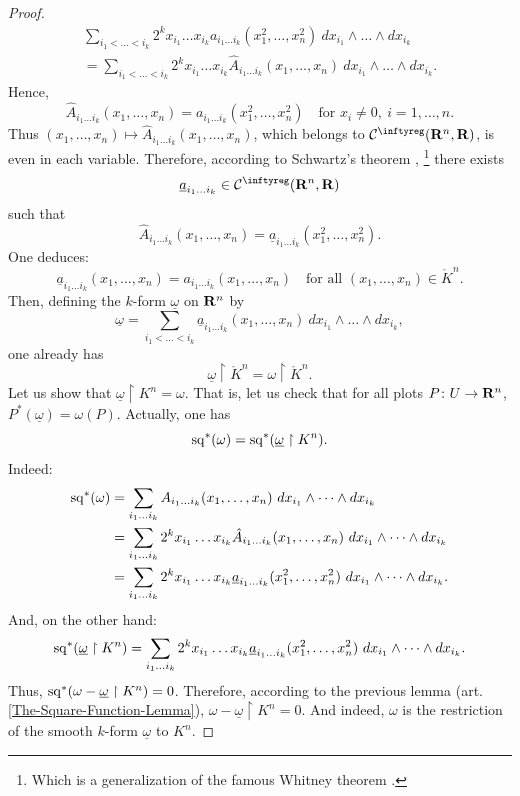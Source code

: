 \begin{proof}
\begin{align*}
     \sum_{i_1<\dots<i_k} 2^k x_{i_1}\dots x_{i_k} a_{i_1 \dots i_k}(x_1^2,\dots, x_n^2)\ dx_{i_1} \wedge \dots \wedge dx_{i_k} \\
     = \sum_{i_1<\dots<i_k} 2^k x_{i_1}\dots x_{i_k} \hat A_{i_1 \dots i_k}(x_1,\dots, x_n) \ dx_{i_1} \wedge \dots \wedge dx_{i_k}.
  \end{align*}
  Hence,
  $$%
    \hat A_{i_1 \dots i_k}(x_1,\dots, x_n) = a_{i_1 \dots i_k}(x_1^2,\dots, x_n^2) \quad \text{for } x_i \neq 0,\ i = 1,\dots,n.
  $$%
  Thus $(x_1,\dots, x_n) \mapsto \hat A_{i_1 \dots i_k}(x_1,\dots, x_n)$,
  which belongs to $\Cinfty(\RR^n,\RR)$,
  is even in each variable.
  Therefore,
  according to Schwartz's theorem \cite{Sch75},%
  \footnote{Which is a generalization of the famous Whitney theorem \cite{Whi43}.}
  there exists
  $$%
    \underline{a}_{i_1 \dots i_k} \in \Cinfty(\RR^n,\RR)
  $$%
  such that
  $$%
    \hat A_{i_1 \dots i_k}(x_1,\dots, x_n) = \underline{a}_{i_1 \dots i_k}(x_1^2,\dots, x_n^2).
  $$%
  One deduces:
  $$%
    \underline{a}_{i_1 \dots i_k}(x_1,\dots, x_n) = a_{i_1 \dots i_k}(x_1,\dots, x_n) \quad \text{for all } (x_1,\dots, x_n) \in \mathring{K}^n.
  $$%
  Then,
  defining the $k$-form $\underline\omega$ on $\mathbf{R}^n$ by
  $$%
    \underline\omega = \sum_{i_1<\dots<i_k} \underline{a}_{i_1 \dots i_k}(x_1, \dots, x_n)\ dx_{i_1} \wedge \dots \wedge dx_{i_k},
  $$%
  one already has
  $$%
    \underline\omega \restriction \mathring K^n = \omega \restriction \mathring K^n.
  $$%
  Let us show that $\underline\omega \restriction K^n = \omega$.
  That is,
  let us check that for all plots $P \colon U \to \mathbf{R}^n$,
  $P^*(\underline\omega) = \omega(P)$.
  Actually,
  one has
  $$%
    \Sq^*(\omega) = \Sq^*(\underline\omega \restriction K^n).
  $$%
  Indeed:
  \begin{align*}
    {\operatorname{sq}}^*(\omega) & = \sum_{i_1\dots i_k} A_{i_1\dots i_k}(x_1,\dots,x_n)\ dx_{i_1}\wedge\dots\wedge dx_{i_k} \\
    & = \sum_{i_1\dots i_k} 2^k x_{i_1} \dots x_{i_k} \hat A_{i_1\dots i_k}(x_1,\dots,x_n)\ dx_{i_1}\wedge\dots\wedge dx_{i_k} \\
    & =  \sum_{i_1\dots i_k} 2^k x_{i_1} \dots x_{i_k} \underline{a}_{i_1\dots i_k}(x_1^2,\dots,x_n^2)\ dx_{i_1}\wedge\dots\wedge dx_{i_k}.
  \end{align*}
  And,
  on the other hand:
  \begin{eqnarray*}
    {\operatorname{sq}}^*(\underline\omega\restriction K^n) = \sum_{i_1\dots i_k} 2^k x_{i_1} \dots x_{i_k} \underline{a}_{i_1\dots i_k}(x_1^2,\dots,x_n^2)\ dx_{i_1}\wedge\dots\wedge dx_{i_k}.
  \end{eqnarray*}
  Thus,
  ${\operatorname{sq}}^*(\omega - \underline\omega \restriction K^n) = 0$.
  Therefore,
  according to the previous lemma (art. \ref{The-Square-Function-Lemma}),
  $\omega - \underline\omega \restriction K^n = 0$.
  And indeed,
  $\omega$ is the restriction of the smooth $k$-form $\underline\omega$ to $K^n$.
\end{proof}

